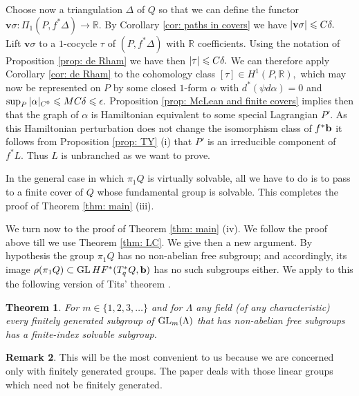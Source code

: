 \documentclass{article}
\theoremstyle{plain}%
\newtheorem{thm}{Theorem}[section]
\theoremstyle{definition}
\newtheorem{rem}[thm]{Remark}
\numberwithin{equation}{section}
\numberwithin{figure}{section}
\def\l{\label}
\def\GL{\mathop{\rm GL}}
\def\le{\leqslant\nobreak}
\def\R{{\mathbin{\mathbb R}}}
\def\al{\alpha}
\def\de{\delta}
\def\ep{\epsilon}
\def\si{\sigma}
\def\ps{\psi}
\def\r{\rho}
\def\ta{\tau}
\def\De{\Delta}
\def\La{\Lambda}
\def\v{{\mathbf{v}}}\def\cl{{\rm cl}}\def\alg{{\rm alg}}\def\geom{{\rm geom}}\def\loc{{\rm loc}}\def\dirlim{\displaystyle\varinjlim}
\begin{document}
Choose now a triangulation $\De$ of $Q$ so that we can define the functor $\v\si:\Pi_1(P,f^*\De)\to\R.$ By Corollary \ref{cor: paths in covers} we have $|\v\si|\le C\de.$ Lift $\v\si$ to a $1$-cocycle $\ta$ of $(P,f^*\De)$ with $\R$ coefficients. Using the notation of Proposition \ref{prop: de Rham} we have then $|\ta|\le C\de.$ We can therefore apply Corollary \ref{cor: de Rham} to the cohomology class $[\ta]\in H^1(P,\R),$ which may now be represented on $P$ by some closed $1$-form $\al$ with  $d^*(\ps d\al)=0$ and $\sup_P|\al|_{C^0}\le MC\de\le \ep.$
Proposition \ref{prop: McLean and finite covers} implies then that the graph of $\al$ is Hamiltonian equivalent to some special Lagrangian $P'.$ As this Hamiltonian perturbation does not change the isomorphism class of $f^*{\mathbf{b}}$ it follows from Proposition \ref{prop: TY} (i) that $P'$ is an irreducible component of $f^*L.$
Thus $L$ is unbranched as we want to prove.

In the general case in which $\pi_1Q$ is virtually solvable, all we have to do is to pass to a finite cover of $Q$ whose fundamental group is solvable. This completes the proof of Theorem \ref{thm: main} (iii). 

We turn now to the proof of Theorem \ref{thm: main} (iv). We follow the proof above till we use Theorem \ref{thm: LC}. We give then a new argument. By hypothesis the group $\pi_1Q$ has no non-abelian free subgroup; and accordingly, its image $\r(\pi_1Q)\subset \GL HF^*(T_q^*Q,\b)$ has no such subgroups either. We apply to this the following version of Tits' theorem \cite[Corollary 1]{Tits}.

\begin{thm}\l{thm: Tits}
For $m\in\{1,2,3,\dots\}$ and for $\La$ any field (of any characteristic) every finitely generated subgroup of $\GL_m(\La)$ that has non-abelian free subgroups has a finite-index solvable subgroup.
\end{thm}
\begin{rem}
This will be the most convenient to us because we are concerned only with finitely generated groups. The paper \cite{Tits} deals with those linear groups which need not be finitely generated.
\end{rem}
\end{document}
